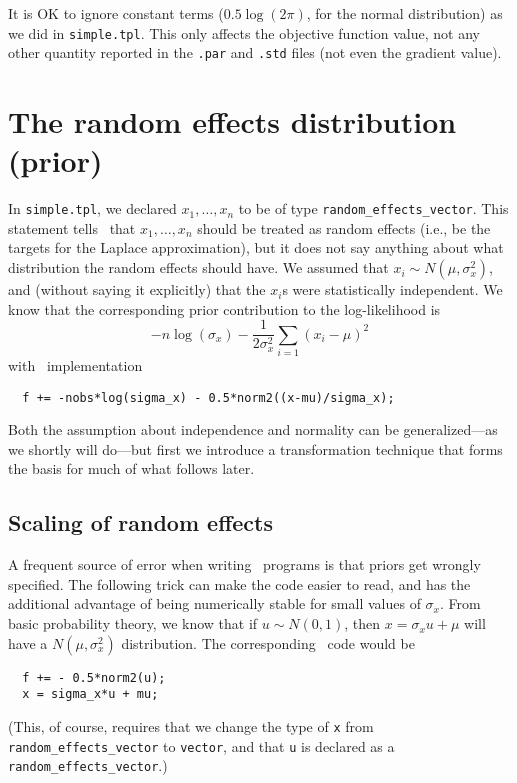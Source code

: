 \documentclass{admbmanual}
\begin{document}
It is OK to ignore constant terms ($0.5\log(2\pi)$, for the normal distribution)
as we did in \texttt{simple.tpl}. This only affects the objective function
value, not any other quantity reported in the \texttt{.par} and \texttt{.std}
files (not even the gradient value).

\section{The random effects distribution (prior)}

In \texttt{simple.tpl}, we declared $x_1,\ldots,x_n$ to be of type
\texttt{random\_effects\_vector}. This statement tells \scAB\ that
$x_1,\ldots,x_n$ should be treated as random effects (i.e., be the targets for
the Laplace approximation), but it does not say anything about what distribution
the random effects should have. We assumed that $x_i\sim N(\mu,\sigma_x^2)$,
and (without saying it explicitly) that the $x_i$s were statistically
independent. We know that the corresponding prior contribution to the
log-likelihood is
\[
-n\log (\sigma_x)-\frac{1}{2\sigma_x^2}\sum_{i=1}\left(x_i-\mu \right)^2
\]
with \scAB\ implementation
\begin{lstlisting}
  f += -nobs*log(sigma_x) - 0.5*norm2((x-mu)/sigma_x);
\end{lstlisting}
Both the assumption about independence and normality can be generalized---as we
shortly will do---but first we introduce a transformation technique that forms
the basis for much of what follows later.

\subsection{Scaling of random effects}

A frequent source of error when writing \scAR\ programs is that priors get
wrongly specified. The following trick can make the code easier to read, and has
the additional advantage of being numerically stable for small values of
$\sigma_x$. From basic probability theory, we know that if $u\sim N(0,1)$,
then $x=\sigma_xu+\mu$ will have a $N(\mu,\sigma_x^2)$ distribution. The
corresponding \scAB\ code would be
\begin{lstlisting}
  f += - 0.5*norm2(u);
  x = sigma_x*u + mu;
\end{lstlisting}
(This, of course, requires that we change the type of \texttt{x} from
\texttt{random\_effects\_vector} to \texttt{vector}, and that \texttt{u} is
declared as a \texttt{random\_effects\_vector}.)
\end{document}
